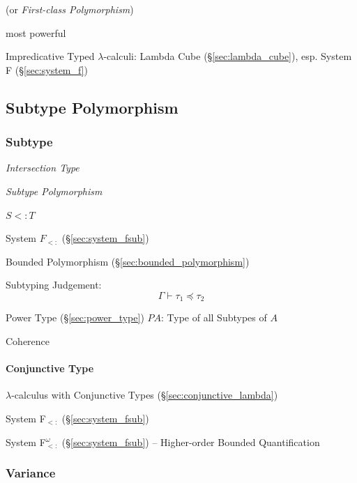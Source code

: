 (or \emph{First-class Polymorphism})

most powerful

Impredicative Typed $\lambda$-calculi: Lambda Cube
(\S\ref{sec:lambda_cube}), esp. System F (\S\ref{sec:system_f})



\subsection{Subtype Polymorphism}\label{sec:subtype_polymorphism}


\subsubsection{Subtype}\label{sec:subtype}

\emph{Intersection Type}

\emph{Subtype Polymorphism}

$S <: T$

System $F_{<:}$ (\S\ref{sec:system_fsub})

Bounded Polymorphism (\S\ref{sec:bounded_polymorphism})

Subtyping Judgement:
\[
  \Gamma \vdash \tau_1 \preceq \tau_2
\]

Power Type (\S\ref{sec:power_type}) $P A$: Type of all Subtypes of $A$

Coherence



\paragraph{Conjunctive Type}\label{sec:conjunctive_type}\hfill

$\lambda$-calculus with Conjunctive Types
(\S\ref{sec:conjunctive_lambda})

System F$_{<:}$ (\S\ref{sec:system_fsub})

System F$_{<:}^\omega$ (\S\ref{sec:system_fsub}) -- Higher-order
Bounded Quantification



\subsubsection{Variance}\label{sec:type_variance}


